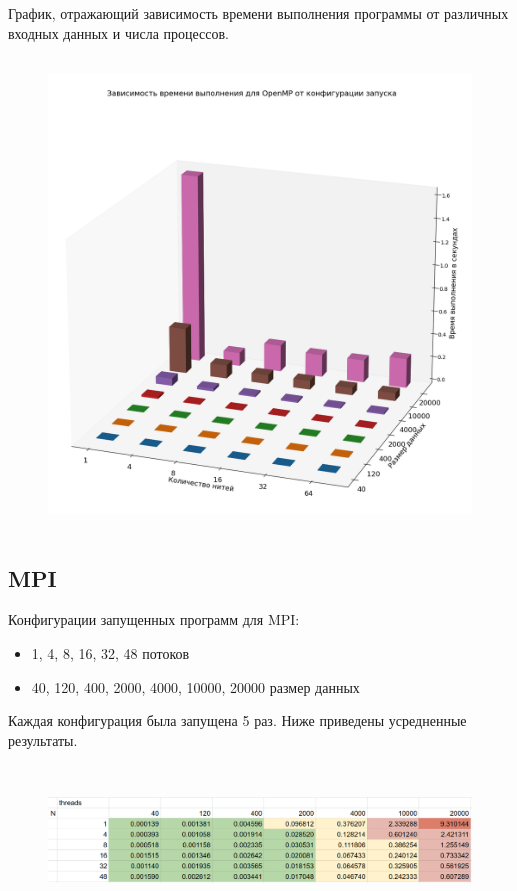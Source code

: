 \documentclass{article}
\begin{document}
График, отражающий зависимость времени выполнения программы от различных входных данных и числа процессов.

\begin{figure}[H]
    \centering
    \includegraphics[scale = 0.35,width=15cm,height=12.5cm]{omp_plot.png}
\end{figure}

\subsection{MPI}

\vspace{0.5cm}
Конфигурации запущенных программ для MPI:
\begin{itemize}
    \item 1, 4, 8, 16, 32, 48 потоков
    \item 40, 120, 400, 2000, 4000, 10000, 20000 размер данных
\end{itemize}

Каждая конфигурация была запущена 5 раз. Ниже приведены усредненные результаты.

\begin{figure}[H]
    \centering
    \includegraphics[width=13cm,height=4cm]{mpi_res.png}
\end{figure}
\end{document}
